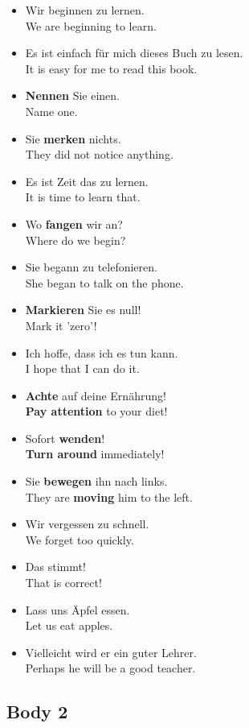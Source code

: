 \begin{itemize}
  \item  Wir beginnen zu lernen. \\
  We are beginning to learn.
  \item  Es ist einfach f{\"u}r mich dieses Buch zu lesen. \\
  It is easy for me to read this book.
  \item  \textbf{Nennen} Sie einen. \\
  Name one.
  \item  Sie \textbf{merken} nichts. \\
  They did not notice anything.
  \item  Es ist Zeit das zu lernen. \\
  It is time to learn that.
  \item  Wo \textbf{fangen} wir an? \\
  Where do we begin?
  \item  Sie begann zu telefonieren. \\
  She began to talk on the phone.
  \item  \textbf{Markieren} Sie es null! \\
  Mark it 'zero'!
  \item  Ich hoffe, dass ich es tun kann. \\
  I hope that I can do it.
  \item  \textbf{Achte} auf deine Ern{\"a}hrung! \\
  \textbf{Pay attention} to your diet!
  \item  Sofort \textbf{wenden}! \\
  \textbf{Turn around} immediately!
  \item  Sie \textbf{bewegen} ihn nach links. \\
  They are \textbf{moving} him to the left.
  \item  Wir vergessen zu schnell. \\
  We forget too quickly.
  \item  Das stimmt! \\
  That is correct!
  \item  Lass uns {\"A}pfel essen. \\
  Let us eat apples.
  \item  Vielleicht wird er ein guter Lehrer. \\
  Perhaps he will be a good teacher.
\end{itemize}


\pagebreak
\subsection{Body 2}

